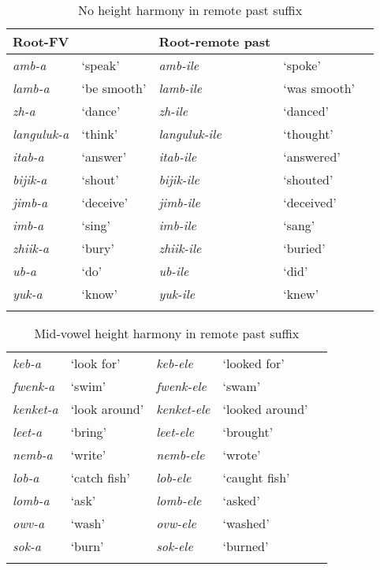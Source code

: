 \documentclass[output=paper]{langsci/langscibook}
\begin{document}
\begin{table}
\begin{tabularx}{\textwidth}{llXXl}%
\lsptoprule
Root-FV & & Root-remote past & & \\
\midrule
\textit{amb-a} & ‘speak’ & \textit{amb-ile} & ‘spoke’ & \\
\textit{lamb-a} & ‘be smooth’ & \textit{lamb-ile} & ‘was smooth’ & \\
\textit{zh-a} & ‘dance’ & \textit{zh-ile} & ‘danced’ & \\
\textit{languluk-a } & ‘think’ &\textit{languluk-ile} & ‘thought’ & \\
\textit{itab-a } & ‘answer’ &\textit{itab-ile } & ‘answered’ & \\
\textit{bijik-a } & ‘shout’ & \textit{bijik-ile } & ‘shouted’ & \\
\textit{jimb-a } & ‘deceive’ & \textit{jimb-ile } & ‘deceived’ & \\
\textit{imb-a } & ‘sing’ & \textit{imb-ile } & ‘sang’ & \\
\textit{zhiik-a } & ‘bury’ & \textit{zhiik-ile } & ‘buried’ & \\
\textit{ub-a } & ‘do’ & \textit{ub-ile } & ‘did’ & \\
\textit{yuk-a } & ‘know’ &\textit{yuk-ile } & ‘knew’ & \\
\lspbottomrule
\end{tabularx}

\caption{No height harmony in remote past suffix}
\label{tab:2.kawasha}

 \end{table}



\begin{table}

\begin{tabularx}{\textwidth}{llXXl}
\lsptoprule
\textit{keb-a}   & ‘look for’    & \textit{keb-ele}    & ‘looked for’    &  \\
\textit{fwenk-a} & ‘swim’    & \textit{fwenk-ele}  & ‘swam’  &  \\
\textit{kenket-a}    & ‘look around’ & \textit{kenket-ele} & ‘looked around’ &  \\
\textit{leet-a}  & ‘bring’   & \textit{leet-ele}   & ‘brought’   &  \\
\textit{nemb-a}  & ‘write’   & \textit{nemb-ele}   & ‘wrote’ &  \\
\textit{lob-a}   & ‘catch fish’  & \textit{lob-ele}    & ‘caught fish’   &  \\
\textit{lomb-a}  & ‘ask’ & \textit{lomb-ele}   & ‘asked’ &  \\
\textit{owv-a}   & ‘wash’    & \textit{ovw-ele}    & ‘washed’    &  \\
\textit{sok-a}   & ‘burn’    & \textit{sok-ele}    & ‘burned’    & \\
\lspbottomrule
\end{tabularx}

\caption{ Mid-vowel height harmony in remote past suffix}
\label{tab:3.kawasha}

 \end{table}
\end{document}
